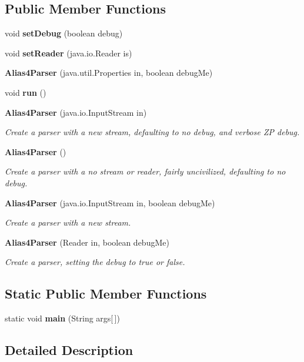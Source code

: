 \subsection*{Public Member Functions}
\begin{DoxyCompactItemize}
\item 
void {\bf set\-Debug} (boolean debug)
\item 
void {\bf set\-Reader} (java.\-io.\-Reader is)
\item 
{\bf Alias4\-Parser} (java.\-util.\-Properties in, boolean debug\-Me)
\item 
void {\bf run} ()
\item 
{\bf Alias4\-Parser} (java.\-io.\-Input\-Stream in)
\begin{DoxyCompactList}\small\item\em Create a parser with a new stream, defaulting to no debug, and verbose Z\-P debug. \end{DoxyCompactList}\item 
{\bf Alias4\-Parser} ()
\begin{DoxyCompactList}\small\item\em Create a parser with a no stream or reader, fairly uncivilized, defaulting to no debug. \end{DoxyCompactList}\item 
{\bf Alias4\-Parser} (java.\-io.\-Input\-Stream in, boolean debug\-Me)
\begin{DoxyCompactList}\small\item\em Create a parser with a new stream. \end{DoxyCompactList}\item 
{\bf Alias4\-Parser} (Reader in, boolean debug\-Me)
\begin{DoxyCompactList}\small\item\em Create a parser, setting the debug to true or false. \end{DoxyCompactList}\end{DoxyCompactItemize}
\subsection*{Static Public Member Functions}
\begin{DoxyCompactItemize}
\item 
static void {\bf main} (String args[$\,$])
\end{DoxyCompactItemize}


\subsection{Detailed Description}


